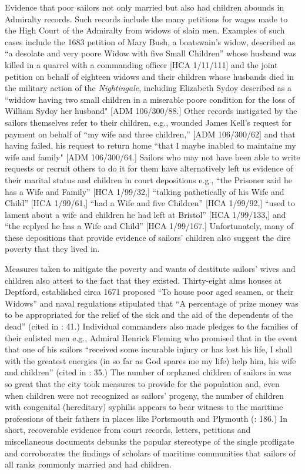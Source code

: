   Evidence that poor sailors not only married but also had children abounds in Admiralty records. Such records include the many petitions for wages made to the High Court of the Admiralty from widows of slain men. Examples of such cases include the 1683 petition of Mary Bush, a boatswain’s widow, described as “a desolate and very poore Widow with five Small Children” whose husband was killed in a quarrel with a commanding officer [HCA 1/11/111] and the joint petition on behalf of eighteen widows and their children whose husbands died in the military action of the \textit{Nightingale}, including Elizabeth Sydoy described as a “widdow having two small children in a miserable poore condition for the loss of William Sydoy her husband" [ADM 106/300/88.] Other records instigated by the sailors themselves refer to their children, e.g., wounded  James Kell’s request for payment on behalf of “my wife and three children,” [ADM 106/300/62] and that having failed, his request to return home “that I maybe inabled to maintaine my wife and family" [ADM 106/300/64.] Sailors who may not have been able to write requests or recruit others to do it for them have alternatively left us evidence of their marital status and children in court depositions e.g., “the Prisoner said he has a Wife and Family” [HCA 1/99/32,] “talking pathetically of his Wife and Child” [HCA 1/99/61,] “had a Wife and five Children” [HCA 1/99/92,] “used to lament about a wife and children he had left at Bristol” [HCA 1/99/133,] and “the  replyed he has a Wife and Child” [HCA 1/99/167.] Unfortunately, many of these depositions that provide evidence of sailors’ children also suggest the dire poverty that they lived in.

Measures taken to mitigate the poverty and wants of destitute sailors’ wives and children also attest to the fact that they existed. Thirty-eight alms houses at Deptford, established circa 1671 proposed “To house poor aged seamen, or their Widows” and naval regulations stipulated that “A percentage of prize money was to be appropriated for the relief of the sick and the aid of the dependents of the dead” (cited in \citealt{Brown2011}: 41.) Individual commanders also made pledges to the families of their enlisted men e.g., Admiral Henrick Fleming who promised that in the event that one of his sailors “received some incurable injury or has lost his life, I shall with the greatest energies (in so far as God spares me my life) help him, his wife and children” (cited in \citealt{Brown2011}: 35.) The number of orphaned children of sailors in  was so great that the city took measures to provide for the population \citep[86]{Litter1999} and, even when children were not recognized as sailors’ progeny, the number of children with congenital (hereditary) syphilis appears to bear witness to the maritime professions of their fathers in places like Portsmouth and Plymouth (\citealt{Brown2011}: 186.) In short, recoverable evidence from court records, letters, petitions and miscellaneous documents debunks the popular stereotype of the single profligate  and corroborates the findings of scholars of maritime communities that sailors of all ranks commonly married and had children. 

